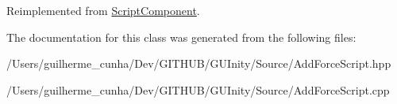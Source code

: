 Reimplemented from \hyperlink{class_script_component_aa765fa62a343a8d83eb168d369b93a51}{Script\+Component}.



The documentation for this class was generated from the following files\+:\begin{DoxyCompactItemize}
\item 
/\+Users/guilherme\+\_\+cunha/\+Dev/\+G\+I\+T\+H\+U\+B/\+G\+U\+Inity/\+Source/Add\+Force\+Script.\+hpp\item 
/\+Users/guilherme\+\_\+cunha/\+Dev/\+G\+I\+T\+H\+U\+B/\+G\+U\+Inity/\+Source/Add\+Force\+Script.\+cpp\end{DoxyCompactItemize}
